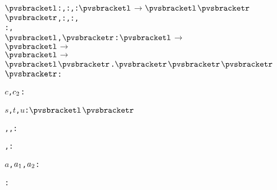\def\setsothermembertwofn#1#2{{(#1 \in #2)}}%
\def\opohtwofn#1#2{{#1\circ#2}}%
\def\opdividetwofn#1#2{{\frac{#1}{#2}}}%
\def\optimestwofn#1#2{{#1\times#2}}%
\def\opdifferenceonefn#1{{-#1}}%
\def\opdifferencetwofn#1#2{{#1-#2}}%
\def\opplustwofn#1#2{{#1+#2}}%
\begin{alltt}
\({\pvsbracketl}\): , : , \pvsid{\{||\}}: \({\pvsbracketl}\) \(\rightarrow\) \({\pvsbracketl}\)\({\pvsbracketr}\)\({\pvsbracketr}\), : , : ,
                   : ,
                   \pvsid{(} \({\pvsbracketl}\), \({\pvsbracketr}\)\pvsid{)} \pvsid{[||]}: \({\pvsbracketl}\) \(\rightarrow\)
                                                                  \({\pvsbracketl}\) \(\rightarrow\)
                                                                    \({\pvsbracketl}\) \(\rightarrow\)
                                                                      \({\pvsbracketl}\)\({\pvsbracketr}\).\({\pvsbracketr}\)\({\pvsbracketr}\)\({\pvsbracketr}\)\({\pvsbracketr}\): 

  \(c\), \(c\sb{2}\):  \vspace*{\pvsdeclspacing}

  \(s\), \(t\), \(u\):  \({\pvsbracketl}\)\({\pvsbracketr}\)\vspace*{\pvsdeclspacing}

  , , :  \vspace*{\pvsdeclspacing}

  , :  \vspace*{\pvsdeclspacing}

  \(a\), \(a\sb{1}\), \(a\sb{2}\):  \vspace*{\pvsdeclspacing}

  :  \vspace*{\pvsdeclspacing}


\end{alltt}

